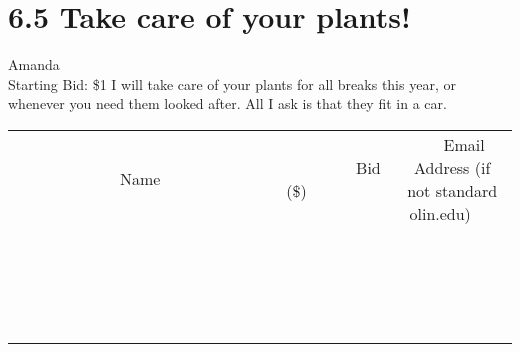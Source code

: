 \documentclass[11pt]{article}
\begin{document}
\section*{6.5 Take care of your plants!}
Amanda
\\
Starting Bid: \$1
\newline
I will take care of your plants for all breaks this year, or whenever you need them looked after. All I ask is that they fit in a car.
\\[3ex]
\begin{tabular}{c c c}
~~~~~~~~~~~~~Name~~~~~~~~~~~~~ & ~~~~~~~~~Bid (\$)~~~~~~~~~  & ~~~Email Address (if not standard olin.edu)~~~\\
 & & \\
\hline
 & & \\
\hline
 & & \\
\hline
 & & \\
\hline
 & & \\
\hline
 & & \\
\hline
 & & \\
\hline
 & & \\
\hline
 & & \\
\hline
 & & \\
\hline
 & & \\
\hline
 & & \\
\hline
 & & \\
\hline
 & & \\
\hline
 & & \\
\hline
 & & \\
\hline
 & & \\
\hline
 & & \\
\hline
 & & \\
\hline
\end{tabular}
\newpage
\end{document}
